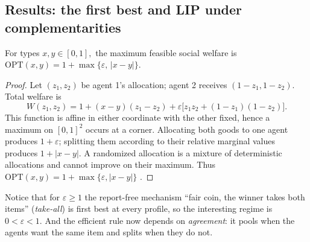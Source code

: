 \subsection{Results: the first best and LIP under complementarities}

\begin{proposition}\label{prop:fb} For types $x, y \in [0, 1],$ the maximum feasible social welfare is
$\mathrm{OPT}(x,y)=1+\max\{\varepsilon,\,|x-y|\}$.
\end{proposition}
\begin{proof}
Let $(z_1,z_2)$ be agent 1's allocation; agent 2 receives
$(1-z_1,1-z_2)$. Total welfare is
\[
{W(z_1,z_2)=1+(x-y)(z_1-z_2)
 +\varepsilon\big[z_1z_2+(1-z_1)(1-z_2)\big].
}\]
{This function is affine in either coordinate with the other fixed, hence a
maximum on $[0,1]^2$ occurs at a corner. Allocating both goods to one agent
produces $1+\varepsilon$; splitting them according to their relative marginal
values produces $1+|x-y|$. A randomized allocation is a mixture of deterministic
allocations and cannot improve on their maximum. Thus
$\mathrm{OPT}(x,y)=1+\max\{\varepsilon,|x-y|\}$} .
\end{proof}

Notice that for $\varepsilon\ge1$ the report-free mechanism ``fair coin, the
winner takes both items'' (\emph{take-all}) is first best at every profile, so the interesting
regime is $0<\varepsilon<1$. And the efficient rule now depends on \emph{agreement}: it pools when
the agents want the same item and splits when they do not.

